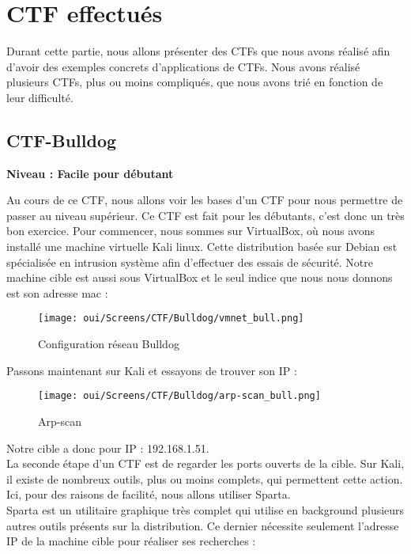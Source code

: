 \chapter{CTF effectués}
\label{chap:BDD}

Durant cette partie, nous allons présenter des CTFs que nous avons réalisé afin d'avoir des exemples concrets d'applications de CTFs. Nous avons réalisé plusieurs CTFs, plus ou moins compliqués, que nous avons trié en fonction de leur difficulté.

\section{CTF-Bulldog}
\noindent \textbf{Niveau : Facile pour débutant}

Au cours de ce CTF, nous allons voir les bases d’un CTF pour nous permettre de passer au niveau supérieur. Ce CTF est fait pour les débutants, c’est donc un très bon exercice. Pour commencer, nous sommes sur VirtualBox, où nous avons installé une machine virtuelle Kali linux. Cette distribution basée sur Debian est spécialisée en intrusion système afin d’effectuer des essais de sécurité. Notre machine cible est aussi sous VirtualBox et le seul indice que nous nous donnons est son adresse mac :

\begin{figure}[htp!]
  \centering
  \setlength\figureheight{7cm}
  \setlength\figurewidth{9cm}
  \texttt{[image: oui/Screens/CTF/Bulldog/vmnet\_bull.png]}
  \caption{Configuration réseau Bulldog}
  \label{fig:courbe-tikz}
\end{figure}

 \newpage
Passons maintenant sur Kali et essayons de trouver son IP :

\begin{figure}[htp!]
  \centering
  \setlength\figureheight{7cm}
  \setlength\figurewidth{9cm}
  \texttt{[image: oui/Screens/CTF/Bulldog/arp-scan\_bull.png]}
  \caption{Arp-scan}
  \label{fig:courbe-tikz}
\end{figure}

Notre cible a donc pour IP : 192.168.1.51.\\
La seconde étape d’un CTF est de regarder les ports ouverts de la cible. Sur Kali, il existe de nombreux outils, plus ou moins complets, qui permettent cette action. Ici, pour des raisons de facilité, nous allons utiliser Sparta.\\ 
Sparta est un utilitaire graphique très complet qui utilise en background plusieurs autres outils présents sur la distribution. Ce dernier nécessite seulement l’adresse IP de la machine cible pour réaliser ses recherches :

